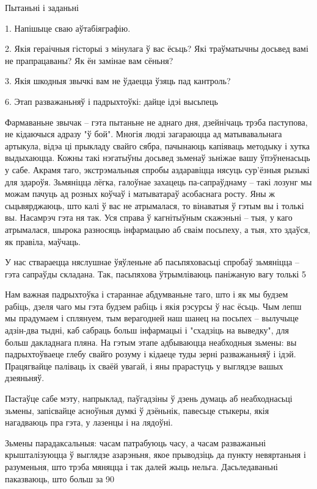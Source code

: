 Пытаньні і заданьні

1. Напішыце сваю аўтабіяграфію.

2. Якія гераічныя гісторыі з мінулага ў вас ёсьць? Які траўматычны досьвед вамі не прапрацаваны? Як ён замінае вам сёньня?

3. Якія шкодныя звычкі вам не ўдаецца ўзяць пад кантроль?


6. Этап разважаньняў і падрыхтоўкі: дайце ідэі высьпець

Фармаваньне звычак – гэта пытаньне не аднаго дня, дзейнічаць трэба паступова, не кідаючыся адразу "ў бой". Многія людзі загараюцца ад матывавальнага артыкула, відэа ці прыкладу свайго сябра, пачынаюць капіяваць методыку і хутка выдыхаюцца. Кожны такі нэгатыўны досьвед зьменаў зьніжае вашу ўпэўненасьць у сабе. Акрамя таго, экстрэмальныя спробы аздаравіцца нясуць сур'ёзныя рызыкі для здароўя. Зьмяніцца лёгка, галоўнае захацець па-сапраўднаму – такі лозунг мы можам пачуць ад розных коўчаў і матыватараў асобаснага росту. Яны ж сьцьвярджаюць, што калі ў вас не атрымалася, то вінаватыя ў гэтым вы і толькі вы. Насамрэч гэта ня так. Уся справа ў кагнітыўным скажэньні – тыя, у каго атрымалася, шырока разносяць інфармацыю аб сваім посьпеху, а тыя, хто здаўся, як правіла, маўчаць.

У нас ствараецца няслушнае ўяўленьне аб пасьпяховасьці спробаў зьмяніцца – гэта сапраўды складана. Так, пасьпяхова ўтрымліваюць паніжаную вагу толькі 5%

Нам важная падрыхтоўка і стараннае абдумваньне таго, што і як мы будзем рабіць, дзеля чаго мы гэта будзем рабіць і якія рэсурсы ў нас ёсьць. Чым лепш мы прадумаем і сплянуем, тым верагодней наш шанец на посьпех – вылучыце адзін-два тыдні, каб сабраць больш інфармацыі і "схадзіць на выведку", для больш дакладнага пляна. На гэтым этапе адбываюцца неабходныя зьмены: вы падрыхтоўваеце глебу свайго розуму і кідаеце туды зерні разважаньняў і ідэй. Працягвайце паліваць іх сваёй увагай, і яны прарастуць у выглядзе вашых дзеяньняў.

Пастаўце сабе мэту, напрыклад, паўгадзіны ў дзень думаць аб неабходнасьці зьмены, запісвайце асноўныя думкі ў дзёньнік, павесьце стыкеры, якія нагадваюць пра гэта, у лазенцы і на лядоўні.

Зьмены парадаксальныя: часам патрабуюць часу, а часам разважаньні крышталізуюцца ў выглядзе азарэньня, якое прыводзіць да пункту невяртаньня і разуменьня, што трэба мяняцца і так далей жыць нельга. Дасьледаваньні паказваюць, што больш за 90%

